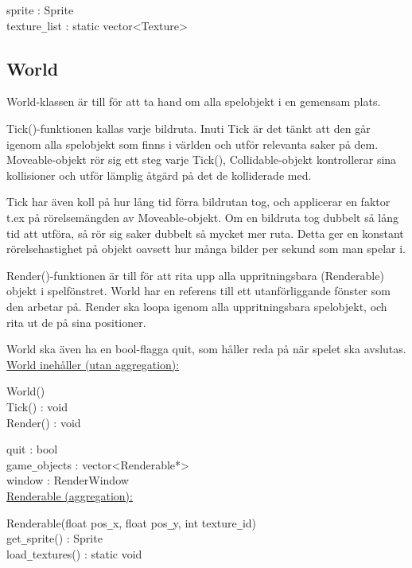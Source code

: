 \documentclass{TDP005mall}
\begin{document}
sprite : Sprite\\
texture\verb|_|list : static vector<Texture>\\


\subsection{World}

World-klassen är till för att ta hand om alla spelobjekt i en gemensam plats.

Tick()-funktionen kallas varje bildruta. Inuti Tick är det tänkt att den går
igenom alla spelobjekt som finns i världen och utför relevanta saker på dem.
Moveable-objekt rör sig ett steg varje Tick(), Collidable-objekt kontrollerar sina
kollisioner och utför lämplig åtgärd på det de kolliderade med.

Tick har även koll på hur lång tid förra bildrutan tog, och applicerar en faktor
t.ex på rörelsemängden av Moveable-objekt. Om en bildruta tog dubbelt så lång tid
att utföra, så rör sig saker dubbelt så mycket mer ruta. Detta ger en konstant
rörelsehastighet på objekt oavsett hur många bilder per sekund som man spelar i.

Render()-funktionen är till för att rita upp alla uppritningsbara (Renderable) objekt
i spelfönstret. World har en referens till ett utanförliggande fönster som den arbetar på.
Render ska loopa igenom alla uppritningsbara spelobjekt, och rita ut de på sina
positioner.

World ska även ha en bool-flagga quit, som håller reda på när spelet ska avslutas.\\

\underline{World inehåller (utan aggregation):}

World()\\
Tick() : void\\
Render() : void

quit : bool\\
game\verb|_|objects : vector<Renderable*>\\
window : RenderWindow\\

\underline{Renderable (aggregation):}

Renderable(float pos\verb|_|x, float pos\verb|_|y, int texture\verb|_|id)\\
get\verb|_|sprite() : Sprite\\
load\verb|_|textures() : static void\\

\clearpage
\end{document}
